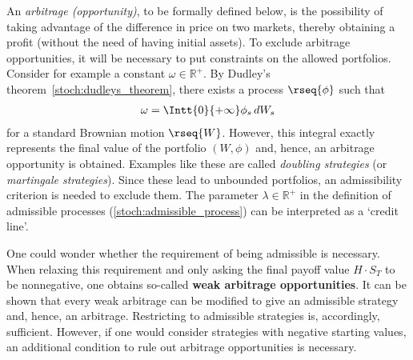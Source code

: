     An \textit{arbitrage (opportunity)}, to be formally defined below, is the possibility of taking advantage of the difference in price on two markets, thereby obtaining a profit (without the need of having initial assets). To exclude arbitrage opportunities, it will be necessary to put constraints on the allowed portfolios. Consider for example a constant $\omega\in\mathbb{R}^+$. By Dudley's theorem~\ref{stoch:dudleys_theorem}, there exists a process $\rseq{\phi}$ such that
    \begin{gather}
        \omega = \Intt{0}{+\infty}\phi_s\,dW_s
    \end{gather}
    for a standard Brownian motion $\rseq{W}$. However, this integral exactly represents the final value of the portfolio $(W,\phi)$ and, hence, an arbitrage opportunity is obtained. Examples like these are called \textit{doubling strategies} (or \textit{martingale strategies}). Since these lead to unbounded portfolios, an admissibility criterion is needed to exclude them. The parameter $\lambda\in\mathbb{R}^+$ in the definition of admissible processes (\cref{stoch:admissible_process}) can be interpreted as a `credit line'.



    \begin{remark}[Admissibility]
        One could wonder whether the requirement of being admissible is necessary. When relaxing this requirement and only asking the final payoff value $H\cdot S_T$ to be nonnegative, one obtains so-called \textbf{weak arbitrage opportunities}. It can be shown that every weak arbitrage can be modified to give an admissible strategy and, hence, an arbitrage. Restricting to admissible strategies is, accordingly, sufficient. However, if one would consider strategies with negative starting values, an additional condition to rule out arbitrage opportunities is necessary.
    \end{remark}

